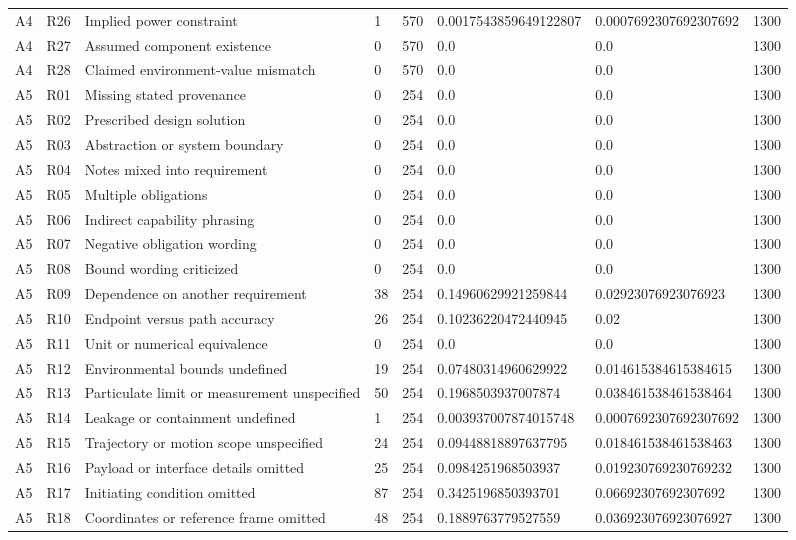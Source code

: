 \begin{tabular}{llllllll}
A4 & R26 & Implied power constraint & 1 & 570 & 0.0017543859649122807 & 0.0007692307692307692 & 1300 \\
A4 & R27 & Assumed component existence & 0 & 570 & 0.0 & 0.0 & 1300 \\
A4 & R28 & Claimed environment-value mismatch & 0 & 570 & 0.0 & 0.0 & 1300 \\
A5 & R01 & Missing stated provenance & 0 & 254 & 0.0 & 0.0 & 1300 \\
A5 & R02 & Prescribed design solution & 0 & 254 & 0.0 & 0.0 & 1300 \\
A5 & R03 & Abstraction or system boundary & 0 & 254 & 0.0 & 0.0 & 1300 \\
A5 & R04 & Notes mixed into requirement & 0 & 254 & 0.0 & 0.0 & 1300 \\
A5 & R05 & Multiple obligations & 0 & 254 & 0.0 & 0.0 & 1300 \\
A5 & R06 & Indirect capability phrasing & 0 & 254 & 0.0 & 0.0 & 1300 \\
A5 & R07 & Negative obligation wording & 0 & 254 & 0.0 & 0.0 & 1300 \\
A5 & R08 & Bound wording criticized & 0 & 254 & 0.0 & 0.0 & 1300 \\
A5 & R09 & Dependence on another requirement & 38 & 254 & 0.14960629921259844 & 0.02923076923076923 & 1300 \\
A5 & R10 & Endpoint versus path accuracy & 26 & 254 & 0.10236220472440945 & 0.02 & 1300 \\
A5 & R11 & Unit or numerical equivalence & 0 & 254 & 0.0 & 0.0 & 1300 \\
A5 & R12 & Environmental bounds undefined & 19 & 254 & 0.07480314960629922 & 0.014615384615384615 & 1300 \\
A5 & R13 & Particulate limit or measurement unspecified & 50 & 254 & 0.1968503937007874 & 0.038461538461538464 & 1300 \\
A5 & R14 & Leakage or containment undefined & 1 & 254 & 0.003937007874015748 & 0.0007692307692307692 & 1300 \\
A5 & R15 & Trajectory or motion scope unspecified & 24 & 254 & 0.09448818897637795 & 0.018461538461538463 & 1300 \\
A5 & R16 & Payload or interface details omitted & 25 & 254 & 0.0984251968503937 & 0.019230769230769232 & 1300 \\
A5 & R17 & Initiating condition omitted & 87 & 254 & 0.3425196850393701 & 0.06692307692307692 & 1300 \\
A5 & R18 & Coordinates or reference frame omitted & 48 & 254 & 0.1889763779527559 & 0.036923076923076927 & 1300 \\

\end{tabular}
